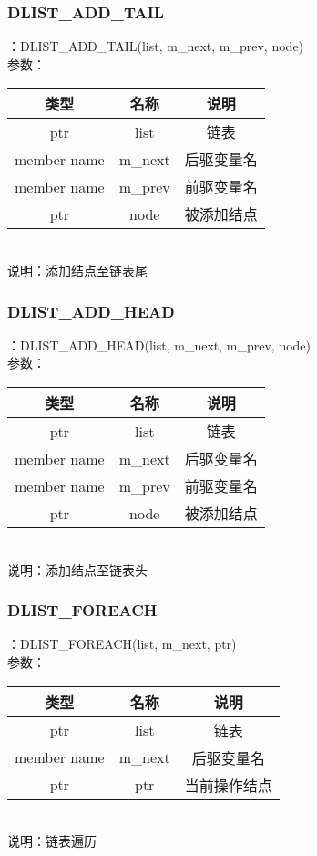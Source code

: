 \subsubsection{DLIST\_ADD\_TAIL}
：DLIST\_ADD\_TAIL(list, m\_next, m\_prev, node)\\
参数：\\
\begin{tabular}{|c|c|c|}
    \hline
    类型 & 名称 & 说明\\\hline
    ptr & list & 链表\\\hline
    member name & m\_next & 后驱变量名\\\hline
    member name & m\_prev & 前驱变量名\\\hline
    ptr & node & 被添加结点\\\hline
\end{tabular}\\
说明：添加结点至链表尾

\subsubsection{DLIST\_ADD\_HEAD}
：DLIST\_ADD\_HEAD(list, m\_next, m\_prev, node)\\
参数：\\
\begin{tabular}{|c|c|c|}
    \hline
    类型 & 名称 & 说明\\\hline
    ptr & list & 链表\\\hline
    member name & m\_next & 后驱变量名\\\hline
    member name & m\_prev & 前驱变量名\\\hline
    ptr & node & 被添加结点\\\hline
\end{tabular}\\
说明：添加结点至链表头

\subsubsection{DLIST\_FOREACH}
：DLIST\_FOREACH(list, m\_next, ptr)\\
参数：\\
\begin{tabular}{|c|c|c|}
    \hline
    类型 & 名称 & 说明\\\hline
    ptr & list & 链表\\\hline
    member name & m\_next & 后驱变量名\\\hline
    ptr & ptr & 当前操作结点\\\hline
\end{tabular}\\
说明：链表遍历

